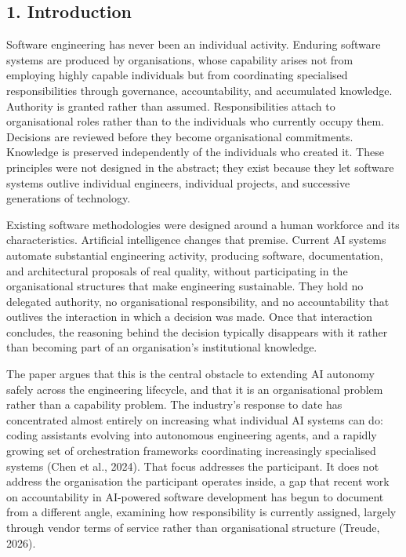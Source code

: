 \documentclass[
]{article}
\begin{document}
\hypertarget{introduction}{%
\subsection{1. Introduction}\label{introduction}}

Software engineering has never been an individual activity. Enduring
software systems are produced by organisations, whose capability arises
not from employing highly capable individuals but from coordinating
specialised responsibilities through governance, accountability, and
accumulated knowledge. Authority is granted rather than assumed.
Responsibilities attach to organisational roles rather than to the
individuals who currently occupy them. Decisions are reviewed before
they become organisational commitments. Knowledge is preserved
independently of the individuals who created it. These principles were
not designed in the abstract; they exist because they let software
systems outlive individual engineers, individual projects, and
successive generations of technology.

Existing software methodologies were designed around a human workforce
and its characteristics. Artificial intelligence changes that premise.
Current AI systems automate substantial engineering activity, producing
software, documentation, and architectural proposals of real quality,
without participating in the organisational structures that make
engineering sustainable. They hold no delegated authority, no
organisational responsibility, and no accountability that outlives the
interaction in which a decision was made. Once that interaction
concludes, the reasoning behind the decision typically disappears with
it rather than becoming part of an organisation's institutional
knowledge.

The paper argues that this is the central obstacle to extending AI
autonomy safely across the engineering lifecycle, and that it is an
organisational problem rather than a capability problem. The industry's
response to date has concentrated almost entirely on increasing what
individual AI systems can do: coding assistants evolving into autonomous
engineering agents, and a rapidly growing set of orchestration
frameworks coordinating increasingly specialised systems (Chen et al.,
2024). That focus addresses the participant. It does not address the
organisation the participant operates inside, a gap that recent work on
accountability in AI-powered software development has begun to document
from a different angle, examining how responsibility is currently
assigned, largely through vendor terms of service rather than
organisational structure (Treude, 2026).
\end{document}
